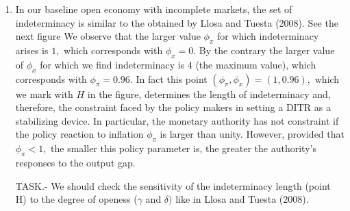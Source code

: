 \documentclass{article}
\begin{document}
\begin{enumerate}
\item In our baseline open economy with incomplete markets, the set of
indeterminacy is similar to the obtained by Llosa and Tuesta (2008). See the
next figure%
We observe that the larger value $\phi _{\pi }$ for which indeterminacy
arises is $1,$ which corresponds with $\phi _{x}=0.$ By the contrary the
larger value of $\phi _{x}$ for which we find indeterminacy is $4$ (the
maximum value), which corresponds with $\phi _{\pi }=0.96.$ In fact this
point $\left( \phi _{\pi },\phi _{x}\right) =\left( 1,0.96\right) ,$ which
we mark with $H$ in the figure, determines the length of indeterminacy and,
therefore, the constraint faced by the policy makers in setting a DITR as a
stabilizing device. In particular, the monetary authority has not constraint
if the policy reaction to inflation $\phi _{\pi }$ is larger than unity.
However, provided that $\phi _{\pi }<1,$ the smaller this policy parameter
is, the greater the authority's responses to the output gap.

TASK.- We should check the sensitivity of the indeterminacy length (point H)
to the degree of openess ($\gamma $ and $\delta )$ like in Llosa and Tuesta
(2008).


\end{enumerate}
\end{document}
